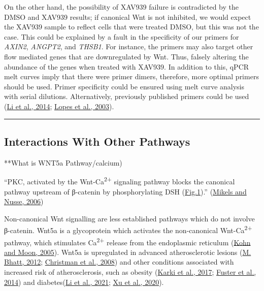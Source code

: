 \documentclass[
  11pt,
]{article}
\begin{document}
On the other hand, the possibility of XAV939 failure is contradicted by the DMSO and XAV939 results; if canonical Wnt is not inhibited, we would expect the XAV939 sample to reflect cells that were treated DMSO, but this was not the case.
This could be explained by a fault in the specificity of our primers for \emph{AXIN2}, \emph{ANGPT2}, and \emph{THSB1}.
For instance, the primers may also target other flow mediated genes that are downregulated by Wnt.
Thus, falsely altering the abundance of the genes when treated with XAV939.
In addition to this, qPCR melt curves imply that there were primer dimers, therefore, more optimal primers should be used.
Primer specificity could be ensured using melt curve analysis with serial dilutions.
Alternatively, previously published primers could be used (\protect\hyperlink{ref-Li2014-mx}{Li et al., 2014}; \protect\hyperlink{ref-lopes2003}{Lopes et al., 2003}).

\begin{center}\rule{0.5\linewidth}{0.5pt}\end{center}

\hypertarget{interactions-with-other-pathways}{%
\subsection{Interactions With Other Pathways}\label{interactions-with-other-pathways}}

**What is WNT5a Pathway/calcium)

``PKC, activated by the Wnt-Ca\textsuperscript{2+} signaling pathway blocks the canonical pathway upstream of β-catenin by phosphorylating DSH (\href{https://www.sciencedirect.com/science/article/pii/S0021915014013549\#fig1}{Fig.1}).'' (\protect\hyperlink{ref-Mikels2006}{Mikels and Nusse, 2006})

Non-canonical Wnt signalling are less established pathways which do not involve β-catenin.
Wnt5a is a glycoprotein which activates the non-canonical Wnt-Ca\textsuperscript{2+} pathway, which stimulates Ca\textsuperscript{2+} release from the endoplasmic reticulum (\protect\hyperlink{ref-Kohn2005}{Kohn and Moon, 2005}). Wnt5a is upregulated in advanced atherosclerotic lesions (\protect\hyperlink{ref-Bhatt2012}{M. Bhatt, 2012}; \protect\hyperlink{ref-Christman2008}{Christman et al., 2008}) and other conditions associated with increased risk of atherosclerosis, such as obesity (\protect\hyperlink{ref-karki2017}{Karki et al., 2017}; \protect\hyperlink{ref-fuster2014}{Fuster et al., 2014}) and diabetes(\protect\hyperlink{ref-Li2021}{Li et al., 2021}; \protect\hyperlink{ref-Xu2020}{Xu et al., 2020}).
\end{document}
